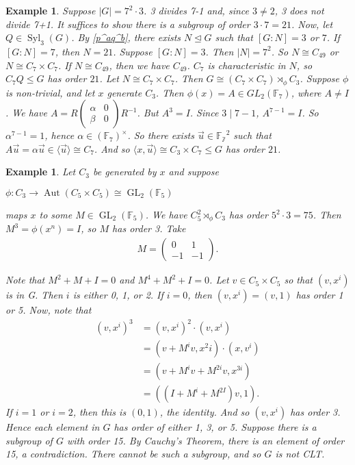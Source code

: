 \documentclass[12pt]{report}
\theoremstyle{newthm}
\newtheorem{Example}[lem]{Example}
\DeclareMathOperator{\Syl}{Syl}
\DeclareMathOperator{\Aut}{Aut}
\DeclareMathOperator{\GL}{GL}
\begin{document}
\begin{Example}
Suppose $|G|=7^2\cdot3$. 3 divides 7-1 and, since $3\neq 2$, 3 does not divide 7+1. It suffices to show there is a subgroup of order $3\cdot 7=21$. Now, let $Q\in\Syl_3(G)$. By \ref{p^aq^b}, there exists $N\trianglelefteq G$ such that $[G:N]=3$ or $7$. If $[G:N]=7$, then $N=21$. Suppose $[G:N]=3$. Then $|N|=7^2$. So $N\cong C_{49}$ or $N\cong C_7\times C_7$. If $N\cong C_{49}$, then we have $C_{49}$. $C_7$ is characteristic in $N$, so $C_7Q\leq G$ has order $21$. Let $N\cong C_7\times C_7$. Then $G\cong (C_7\times C_7)\rtimes_\phi C_3$. Suppose $\phi$ is non-trivial, and let $x$ generate $C_3$. Then $\phi(x)=A\in GL_2(\mathbb{F}_7)$, where $A\neq I$. We have $A=R(\begin{smallmatrix}\alpha & 0 \\ \beta & 0\end{smallmatrix})R^{-1}$. But $A^3=I$. Since $3 \mid 7-1$, $A^{7-1}=I$. So $\alpha^{7-1}=1$, hence $\alpha\in(\mathbb{F}_7)^{\times}$. So there exists $\Vec{u}\in \mathbb{F_7}^2$ such that $A\Vec{u}=\alpha\Vec{u}\in\langle \Vec{u}\rangle\cong C_7$. And so $\langle x, \Vec{u}\rangle\cong C_3\times C_7\leq G$ has order $21$.
\end{Example}

\begin{Example}
Let $C_3$ be generated by $x$ and suppose \begin{center}$\phi:C_3\rightarrow \Aut(C_5\times C_5)\cong \GL_2(\mathbb{F}_5)$ \end{center} maps $x$ to some $M\in \GL_2(\mathbb{F}_5)$. We have $C_5^2\rtimes_\phi C_3$ has order $5^2\cdot 3 = 75$. Then $M^3=\phi(x^n)=I$, so $M$ has order 3. Take \begin{align*}
    M=\begin{pmatrix}0 & 1 \\ -1 & -1\end{pmatrix}.
\end{align*}

Note that $M^2+M+I=0$ and $M^4+M^2+I=0$. Let $v\in C_5\times C_5$ so that $( v, x^i)$ is in G. Then $i$ is either 0, 1, or 2. If $i=0$, then $( v, x^i)=( v, 1)$ has order 1 or 5. Now, note that 
\begin{align*}
    (v, x^i)^3 &= (v,x^i)^2\cdot(v,x^i)\\
    &=(v+M^iv,x^2i)\cdot(x,v^i)\\
    &=(v+M^iv+M^{2i}v,x^{3i})\\
    &= ((I+M^i+M^{2I})v,1).
\end{align*}
If $i=1$ or $i=2$, then this is $(0,1)$, the identity. And so $(v, x^i)$ has order 3. Hence each element in $G$ has order of either 1, 3, or 5. Suppose there is a subgroup of $G$ with order 15. By Cauchy's Theorem, there is an element of order 15, a contradiction. There cannot be such a subgroup, and so $G$ is not CLT.

\end{Example}
\end{document}
